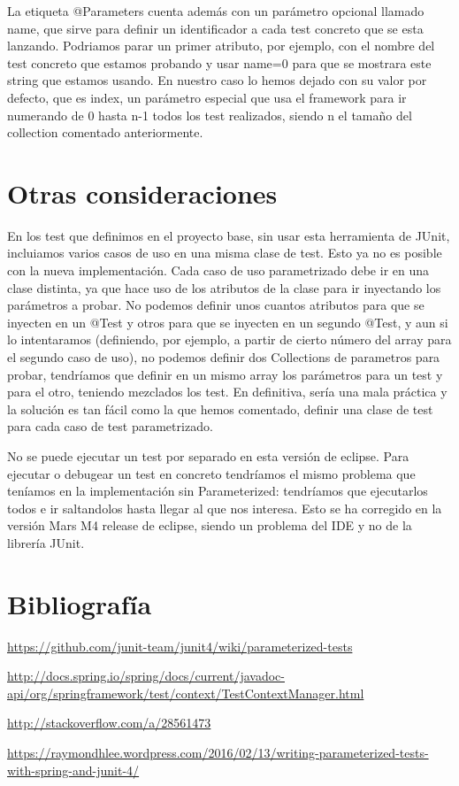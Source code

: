 \documentclass[a4paper]{article}
\begin{document}
La etiqueta @Parameters cuenta además con un parámetro opcional llamado name, que sirve para definir un identificador a cada test concreto que se esta lanzando. Podriamos parar un primer atributo, por ejemplo, con el nombre del test concreto que estamos probando y usar name={0} para que se mostrara este string que estamos usando. En nuestro caso lo hemos dejado con su valor por defecto, que es {index}, un parámetro especial que usa el framework para ir numerando de 0 hasta n-1 todos los test realizados, siendo n el tamaño del collection comentado anteriormente. 

\section{Otras consideraciones}

En los test que definimos en el proyecto base, sin usar esta herramienta de JUnit, incluiamos varios casos de uso en una misma clase de test. Esto ya no es posible con la nueva implementación. Cada caso de uso parametrizado debe ir en una clase distinta, ya que hace uso de los atributos de la clase para ir inyectando los parámetros a probar. No podemos definir unos cuantos atributos para que se inyecten en un @Test y otros para que se inyecten en un segundo @Test, y aun si lo intentaramos (definiendo, por ejemplo, a partir de cierto número del array para el segundo caso de uso), no podemos definir dos Collections de parametros para probar, tendríamos que definir en un mismo array los parámetros para un test y para el otro, teniendo mezclados los test. En definitiva, sería una mala práctica y la solución es tan fácil como la que hemos comentado, definir una clase de test para cada caso de test parametrizado.

No se puede ejecutar un test por separado en esta versión de eclipse. Para ejecutar o debugear un test en concreto tendríamos el mismo problema que teníamos en la implementación sin Parameterized: tendríamos que ejecutarlos todos e ir saltandolos hasta llegar al que nos interesa. Esto se ha corregido en la versión Mars M4 release de eclipse, siendo un problema del IDE y no de la librería JUnit.

\section{Bibliografía}
\url{https://github.com/junit-team/junit4/wiki/parameterized-tests}

\url{http://docs.spring.io/spring/docs/current/javadoc-api/org/springframework/test/context/TestContextManager.html}

\url{http://stackoverflow.com/a/28561473}

\url{https://raymondhlee.wordpress.com/2016/02/13/writing-parameterized-tests-with-spring-and-junit-4/}
\end{document}
